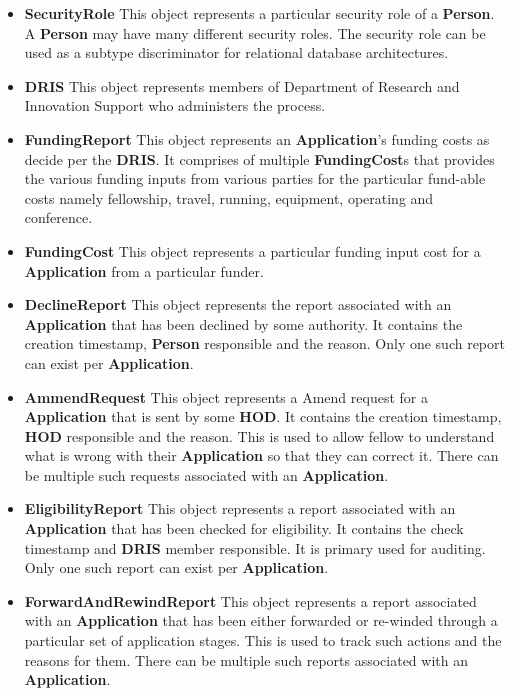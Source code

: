 \documentclass[12pt]{article}
\begin{document}
\begin{itemize}
\item \textbf{SecurityRole}
This object represents a particular security role of a \textbf{Person}. A \textbf{Person} may have many different security roles. The security role can be used as a subtype discriminator for relational database architectures.

\item \textbf{DRIS}
This object represents members of Department of Research and Innovation Support who administers the process.

\item \textbf{FundingReport}
This object represents an \textbf{Application}'s funding costs as decide per the \textbf{DRIS}. It comprises of multiple \textbf{FundingCost}s that provides the various funding inputs from various parties for the particular fund-able costs namely fellowship, travel, running, equipment, operating
and conference.
 
\item \textbf{FundingCost}
This object represents a particular funding input cost for a \textbf{Application} from a particular funder. 

\item \textbf{DeclineReport}
This object represents the report associated with an \textbf{Application} that has been declined by some authority. It contains the creation timestamp, \textbf{Person} responsible and the reason. Only one such report can exist per \textbf{Application}.

\item \textbf{AmmendRequest}
This object represents a Amend request for a \textbf{Application} that is sent by some \textbf{HOD}. It contains the creation timestamp, \textbf{HOD} responsible and the reason. This is used to allow fellow to understand what is wrong with their \textbf{Application} so that they can correct it. There can be multiple such requests associated with an \textbf{Application}.

\item \textbf{EligibilityReport}
This object represents a report associated with an \textbf{Application} that has been checked for eligibility. It contains the check timestamp and \textbf{DRIS} member responsible. It is primary used for auditing. Only one such report can exist per \textbf{Application}.

\item \textbf{ForwardAndRewindReport}
This object represents a report associated with an \textbf{Application} that has been either forwarded or re-winded through a particular set of application stages. This is used to track such actions and the reasons for them. There can be multiple such reports associated with an \textbf{Application}. 
 

\end{itemize}
\end{document}
